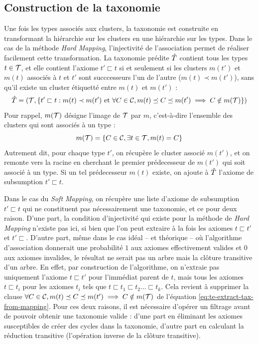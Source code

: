 \subsection{Construction de la taxonomie}
\label{subsec:te-taxconstruction}

Une fois les types associés aux clusters, la taxonomie est construite en transformant la hiérarchie sur les clusters en une hiérarchie sur les types. Dans le cas de la méthode \textit{Hard Mapping}, l'injectivité de l'association permet de réaliser facilement cette transformation. La taxonomie prédite $\Tpred$ contient tous les types $t \in \cal{T}$, et elle contient l'axiome $t' \sqsubset t$ si et seulement si les clusters $m(t')$ et $m(t)$ associés à $t$ et $t'$ sont succcesseurs l'un de l'autre ($m(t) \prec m(t')$), sans qu'il existe un cluster étiquetté entre $m(t)$ et $m(t')$ :
\begin{equation}
    \Tpred = (\cal{T}, \{t' \sqsubset t : m(t) \prec m(t') \text{ et } \forall C \in \cal{C}, m(t) \preceq C \preceq m(t') \implies C \notin m(\cal{T}) \})
    \label{eq:te-extract-tax-from-mapping}
\end{equation}
Pour rappel, $m(\cal{T})$ désigne l'image de $\cal{T}$ par $m$, c'est-à-dire l'ensemble des clusters qui sont associés à un type :
\begin{equation}
    m(\cal{T}) = \{ C \in \cal{C}, \exists t \in \cal{T}, m(t) = C \}
\end{equation}
Autrement dit, pour chaque type $t'$, on récupère le cluster associé $m(t')$, et on remonte vers la racine en cherchant le premier prédecesseur de $m(t')$ qui soit associé à un type. Si un tel prédecesseur $m(t)$ existe, on ajoute à $\Tpred$ l'axiome de subsumption $t' \sqsubset t$.

Dans le cas du \textit{Soft Mapping}, on récupère une liste d'axiome de subsumption $t' \sqsubset t$ qui ne constituent pas nécessairement une taxonomie, et ce pour deux raison. D'une part, la condition d'injectivité qui existe pour la méthode de \textit{Hard Mapping} n'existe pas ici, si bien que l'on peut extraire à la fois les axiomes $t \sqsubset t'$ et $t' \sqsubset$. D'autre part, même dans le cas idéal – et théorique – où l'algorithme d'association donnerait une probabilité $1$ aux axiomes effectivement valides et $0$ aux axiomes invalides, le résultat ne serait pas un arbre mais la clôture transitive d'un arbre. En effet, par construction de l'algorithme, on n'extraie pas uniquement l'axiome $t \sqsubset t'$ pour l'immédiat parent de $t$, mais tous les axiomes $t \sqsubset t_i$ pour les axiomes $t_i$ tels que $t \sqsubset t_1 \sqsubset t_2 \ldots \sqsubset t_k$. Cela revient à supprimer la clause $\forall C \in \cal{C}, m(t) \preceq C \preceq m(t') \implies C \notin m(\cal{T})$ de l'équation \ref{eq:te-extract-tax-from-mapping}. Pour ces deux raisons, il est nécessaire d'opérer un filtrage avant de pouvoir obtenir une taxonomie valide : d'une part en éliminant les axiomes susceptibles de créer des cycles dans la taxonomie, d'autre part en calculant la réduction transitive (l'opération inverse de la clôture transitive).

